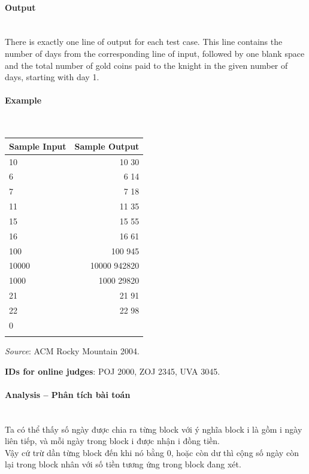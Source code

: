 \documentclass{article}
\begin{document}
\paragraph{Output}\mbox{} \\

There is exactly one line of output for each test case. This line contains the number of days from
the corresponding line of input, followed by one blank space and the total number of gold coins
paid to the knight in the given number of days, starting with day 1.

\paragraph{Example}\mbox{} \\

\begin{table}[h]
    \centering
    \begin{tabular}{|l|r|}
        \hline
        \textbf{Sample Input} & \textbf{Sample Output} \\
        \hline
        10    & 10 30  \\ 
        6    & 6 14 \\ 
        7   & 7 18 \\ 
        11    & 11 35 \\ 
        15    & 15 55 \\ 
		16	&  16 61\\ 
        100    & 100 945 \\ 
        10000    & 10000 942820 \\ 
		1000	& 1000 29820 \\ 
        21    & 21 91 \\ 
        22    & 22 98 \\ 
		0	&  \\ 
            &  \\ \hline
    \end{tabular}
\end{table}

\textit{Source}: ACM Rocky Mountain 2004.

\textbf{IDs for online judges}: POJ 2000, ZOJ 2345, UVA 3045.


\paragraph{Analysis -- Phân tích bài toán} \mbox{} \\

Ta có thể thấy số ngày được chia ra từng block với ý nghĩa block i là gồm i ngày liên tiếp, và mỗi ngày trong block i được nhận i đồng tiền.\\
Vậy cứ trừ dần từng block đến khi nó bằng 0, hoặc còn dư thì cộng số ngày còn lại trong block nhân với số tiền tương ứng trong block đang xét.
\end{document}
